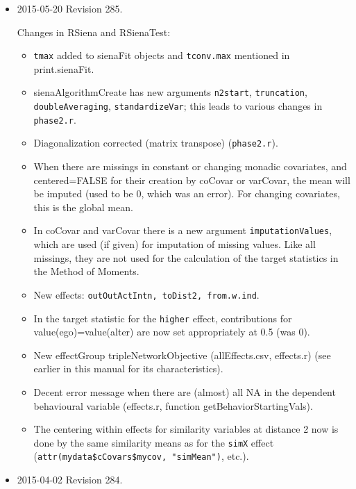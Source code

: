 \documentclass[a4paper,fleqn,11pt]{article}
\newcommand{\+}{\, + \,}
\newcommand{\sfn}[1]{\textsf{#1}}
\begin{document}
\begin{small}
\begin{itemize}
\item 2015-05-20 Revision 285.

Changes in \textsf{RSiena} and \textsf{RSienaTest}:
\begin{itemize}
   \item \texttt{tmax} added to \sfn{sienaFit} objects and
     \texttt{tconv.max} mentioned in \sfn{print.sienaFit}.
   \item \sfn{sienaAlgorithmCreate} has new arguments \texttt{n2start},
     \texttt{truncation}, \texttt{doubleAveraging}, \texttt{standardizeVar};
     this leads to various changes in \texttt{phase2.r}.
   \item Diagonalization corrected (matrix transpose) (\texttt{phase2.r}).
   \item When there are missings in constant or changing monadic covariates,
     and \\centered=FALSE for their creation by \sfn{coCovar} or
	 \sfn{varCovar}, the mean will be imputed (used to be 0, which was an error).
	 For changing covariates, this is the global mean.
   \item In \sfn{coCovar} and \sfn{varCovar} there is a new argument \texttt{imputationValues},
     which are used (if given) for imputation of missing values.
	 Like all missings, they are not used for the calculation
	 of the target statistics in the Method of Moments.
   \item New effects: \texttt{outOutActIntn, toDist2, from.w.ind}.
   \item In the target statistic for the \texttt{higher} effect, contributions for
     value(ego)=value(alter) are now set appropriately at 0.5 (was 0).
   \item New effectGroup \sfn{tripleNetworkObjective} (\sfn{allEffects.csv, effects.r})
     (see earlier in this manual for its characteristics).
   \item Decent error message when there are (almost) all NA in the dependent
     behavioural variable (\sfn{effects.r}, function \sfn{getBehaviorStartingVals}).
   \item The centering within effects for similarity variables at distance 2
     now is done by the same similarity means as for the \texttt{simX} effect
	  (\texttt{attr(mydata\$cCovars\$mycov, "simMean")}, etc.).
\end{itemize}

\item 2015-04-02 Revision 284.


\end{itemize}
\end{small}
\end{document}
